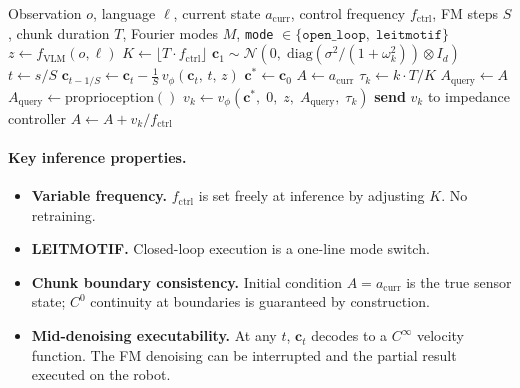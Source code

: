 \documentclass[11pt]{article}
\theoremstyle{plain}
\theoremstyle{definition}
\newcommand{\cN}{\mathcal{N}}
\newcommand{\vnet}{v_\phi}
\newcommand{\acurr}{a_{\mathrm{curr}}}
\newcommand{\tdiff}{t}
\newcommand{\texec}{\tau}
\newcommand{\bz}{z}
\newcommand{\ccoeff}{\mathbf{c}}
\newcommand{\cclean}{\ccoeff^*}
\begin{document}
\begin{algorithm}[H]
\caption{MOTIF Inference}
\label{alg:infer}
\begin{algorithmic}[1]
\Require Observation $o$, language $\ell$, current state $\acurr$,
  control frequency $f_{\mathrm{ctrl}}$, FM steps $S$, chunk duration $T$,
  Fourier modes $M$,
  \texttt{mode} $\in \{\texttt{open\_loop},\;\texttt{leitmotif}\}$
\State $\bz \leftarrow f_{\mathrm{VLM}}(o, \ell)$
\State $K \leftarrow \lfloor T \cdot f_{\mathrm{ctrl}} \rfloor$
\State $\ccoeff_1 \sim \cN\!\left(0,\;\mathrm{diag}(\sigma^2/(1{+}\omega_k^2)) \otimes I_d\right)$
  \State $\tdiff \leftarrow s/S$
  \State $\ccoeff_{\tdiff - 1/S} \leftarrow \ccoeff_\tdiff
    - \tfrac{1}{S}\,\vnet(\ccoeff_\tdiff,\,\tdiff,\,\bz)$
\EndFor
\State $\cclean \leftarrow \ccoeff_0$
\State $A \leftarrow \acurr$
  \State $\texec_k \leftarrow k \cdot T / K$
    \State $A_{\mathrm{query}} \leftarrow A$
    \State $A_{\mathrm{query}} \leftarrow \mathrm{proprioception}()$
  \EndIf
  \State $v_k \leftarrow \vnet(\cclean,\;0,\;\bz,\;A_{\mathrm{query}},\;\texec_k)$
  \State \textbf{send} $v_k$ to impedance controller
  \State $A \leftarrow A + v_k / f_{\mathrm{ctrl}}$
\EndFor
\end{algorithmic}
\end{algorithm}

\paragraph{Key inference properties.}
\begin{itemize}[leftmargin=2em,noitemsep]
  \item \textbf{Variable frequency.} $f_{\mathrm{ctrl}}$ is set freely at
    inference by adjusting $K$. No retraining.
  \item \textbf{LEITMOTIF.} Closed-loop execution is a one-line mode switch.
  \item \textbf{Chunk boundary consistency.} Initial condition $A = \acurr$
    is the true sensor state; $C^0$ continuity at boundaries is guaranteed
    by construction.
  \item \textbf{Mid-denoising executability.} At any $\tdiff$, $\ccoeff_\tdiff$
    decodes to a $C^\infty$ velocity function.
    The FM denoising can be interrupted and the partial result executed
    on the robot.
\end{itemize}
\end{document}
